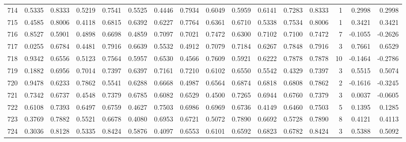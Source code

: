 \begin{tabular}{lrrrrrrrrrrrrrrr}
714 &      0.5335 &  0.8333 &  0.5219 &  0.7541 &  0.5525 &  0.4446 &  0.7934 &  0.6049 &  0.5959 &  0.6141 &   0.7283 &     0.8333 &      1 &                    0.2998 &                     0.2998 \\
715 &      0.4585 &  0.8006 &  0.4118 &  0.6815 &  0.6392 &  0.6227 &  0.7764 &  0.6361 &  0.6710 &  0.5338 &   0.7534 &     0.8006 &      1 &                    0.3421 &                     0.3421 \\
716 &      0.8527 &  0.5901 &  0.4898 &  0.6698 &  0.4859 &  0.7097 &  0.7021 &  0.7472 &  0.6300 &  0.7102 &   0.7100 &     0.7472 &      7 &                   -0.1055 &                    -0.2626 \\
717 &      0.0255 &  0.6784 &  0.4481 &  0.7916 &  0.6639 &  0.5532 &  0.4912 &  0.7079 &  0.7184 &  0.6267 &   0.7848 &     0.7916 &      3 &                    0.7661 &                     0.6529 \\
718 &      0.9342 &  0.6556 &  0.5123 &  0.7564 &  0.5957 &  0.6530 &  0.4566 &  0.7609 &  0.5921 &  0.6222 &   0.7878 &     0.7878 &     10 &                   -0.1464 &                    -0.2786 \\
719 &      0.1882 &  0.6956 &  0.7014 &  0.7397 &  0.6397 &  0.7161 &  0.7210 &  0.6102 &  0.6550 &  0.5542 &   0.4329 &     0.7397 &      3 &                    0.5515 &                     0.5074 \\
720 &      0.9478 &  0.6233 &  0.7862 &  0.5541 &  0.6288 &  0.6668 &  0.4987 &  0.6564 &  0.6874 &  0.6818 &   0.6808 &     0.7862 &      2 &                   -0.1616 &                    -0.3245 \\
721 &      0.7342 &  0.6737 &  0.4548 &  0.7379 &  0.6785 &  0.6082 &  0.6529 &  0.4500 &  0.7265 &  0.6944 &   0.6760 &     0.7379 &      3 &                    0.0037 &                    -0.0605 \\
722 &      0.6108 &  0.7393 &  0.6497 &  0.6759 &  0.4627 &  0.7503 &  0.6986 &  0.6969 &  0.6736 &  0.4149 &   0.6460 &     0.7503 &      5 &                    0.1395 &                     0.1285 \\
723 &      0.3769 &  0.7882 &  0.5521 &  0.6678 &  0.4080 &  0.6953 &  0.6721 &  0.5072 &  0.7890 &  0.6692 &   0.5728 &     0.7890 &      8 &                    0.4121 &                     0.4113 \\
724 &      0.3036 &  0.8128 &  0.5335 &  0.8424 &  0.5876 &  0.4097 &  0.6553 &  0.6101 &  0.6592 &  0.6823 &   0.6782 &     0.8424 &      3 &                    0.5388 &                     0.5092 \\

\end{tabular}

